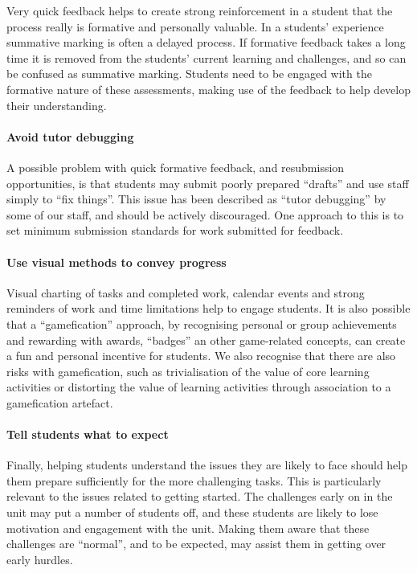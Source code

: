Very quick feedback helps to create strong reinforcement in a student that the process really is formative and personally valuable. In a students' experience summative marking is often a delayed process. If formative feedback takes a long time it is removed from the students' current learning and challenges, and so can be confused as summative marking. Students need to be engaged with the formative nature of these assessments, making use of the feedback to help develop their understanding.

\paragraph{Avoid tutor debugging}

A possible problem with quick formative feedback, and resubmission opportunities, is that students may submit poorly prepared ``drafts'' and use staff simply to ``fix things''. This issue has been described as ``tutor debugging'' by some of our staff, and should be actively discouraged. One approach to this is to set minimum submission standards for work submitted for feedback. 

\paragraph{Use visual methods to convey progress }

Visual charting of tasks and completed work, calendar events and strong reminders of work and time limitations help to engage students. It is also possible that a ``gamefication'' approach, by recognising personal or group achievements and rewarding with awards, ``badges'' an other game-related concepts, can create a fun and personal incentive for students. We also recognise that there are also risks with gamefication, such as trivialisation of the value of core learning activities or distorting the value of learning activities through association to a gamefication artefact.

\paragraph{Tell students what to expect}
Finally, helping students understand the issues they are likely to face should help them prepare sufficiently for the more challenging tasks. This is particularly relevant to the issues related to getting started. The challenges early on in the unit may put a number of students off, and these students are likely to lose motivation and engagement with the unit. Making them aware that these challenges are ``normal'', and to be expected, may assist them in getting over early hurdles.

